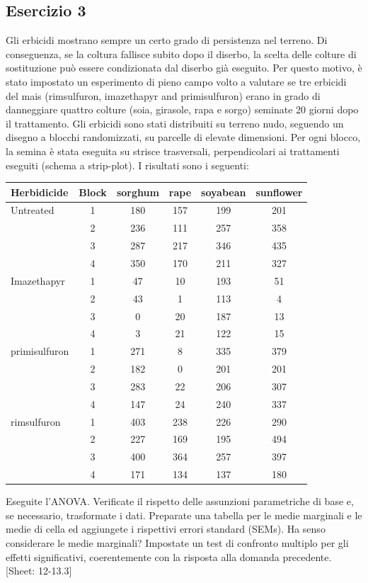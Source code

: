 \documentclass[a4paper,12pt,oneside]{book}
\begin{document}
\hypertarget{esercizio-3-7}{%
\subsection{Esercizio 3}\label{esercizio-3-7}}

Gli erbicidi mostrano sempre un certo grado di persistenza nel terreno. Di conseguenza, se la coltura fallisce subito dopo il diserbo, la scelta delle colture di sostituzione può essere condizionata dal diserbo già eseguito. Per questo motivo, è stato impostato un esperimento di pieno campo volto a valutare se tre erbicidi del mais (rimsulfuron, imazethapyr and primisulfuron) erano in grado di danneggiare quattro colture (soia, girasole, rapa e sorgo) seminate 20 giorni dopo il trattamento. Gli erbicidi sono stati distribuiti su terreno nudo, seguendo un disegno a blocchi randomizzati, su parcelle di elevate dimensioni. Per ogni blocco, la semina è stata eseguita su strisce trasversali, perpendicolari ai trattamenti eseguiti (schema a strip-plot). I risultati sono i seguenti:

\begin{longtable}[]{@{}lccccc@{}}
\toprule()
Herbidicide & Block & sorghum & rape & soyabean & sunflower \\
\midrule()
\endhead
Untreated & 1 & 180 & 157 & 199 & 201 \\
& 2 & 236 & 111 & 257 & 358 \\
& 3 & 287 & 217 & 346 & 435 \\
& 4 & 350 & 170 & 211 & 327 \\
Imazethapyr & 1 & 47 & 10 & 193 & 51 \\
& 2 & 43 & 1 & 113 & 4 \\
& 3 & 0 & 20 & 187 & 13 \\
& 4 & 3 & 21 & 122 & 15 \\
primisulfuron & 1 & 271 & 8 & 335 & 379 \\
& 2 & 182 & 0 & 201 & 201 \\
& 3 & 283 & 22 & 206 & 307 \\
& 4 & 147 & 24 & 240 & 337 \\
rimsulfuron & 1 & 403 & 238 & 226 & 290 \\
& 2 & 227 & 169 & 195 & 494 \\
& 3 & 400 & 364 & 257 & 397 \\
& 4 & 171 & 134 & 137 & 180 \\
\bottomrule()
\end{longtable}

Eseguite l'ANOVA. Verificate il rispetto delle assunzioni parametriche di base e, se necessario, trasformate i dati. Preparate una tabella per le medie marginali e le medie di cella ed aggiungete i rispettivi errori standard (SEMs). Ha senso considerare le medie marginali? Impostate un test di confronto multiplo per gli effetti significativi, coerentemente con la risposta alla domanda precedente.
{[}Sheet: 12-13.3{]}
\end{document}
